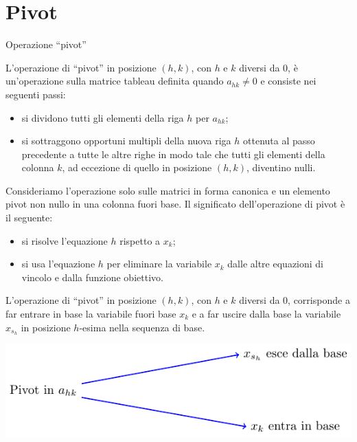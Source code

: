 \documentclass{beamer}
\begin{document}
\section{Pivot}

\begin{frame}[allowframebreaks]{Operazione ``pivot''}

L'operazione di ``pivot'' in posizione $(h, k )$,
con $h$ e $k$ diversi da 0,
\`e un'operazione sulla matrice tableau definita
quando $a_{hk} \neq 0$ e consiste nei seguenti passi:

\begin{itemize}
\item si dividono tutti gli elementi della riga $h$ per $a_{hk}$;

\item si sottraggono opportuni multipli della nuova riga $h$
	ottenuta al passo precedente a tutte le altre righe in modo
	tale che tutti gli elementi della colonna $k$, ad eccezione
	di quello in posizione $(h, k )$, diventino nulli.
\end{itemize}

\framebreak

Consideriamo l'operazione solo sulle matrici in forma canonica e un elemento pivot non nullo in una colonna fuori  base.
Il significato dell'operazione di pivot \`e il seguente:

\begin{itemize}
\item si risolve l'equazione $h$ rispetto a $x_k$;

\item si usa l'equazione $h$ per eliminare la variabile
	$x_k$ dalle altre equazioni di vincolo e dalla funzione
	obiettivo.
\end{itemize}

L'operazione di ``pivot'' in posizione $(h, k )$, con $h$ e $k$
diversi da 0, corrisponde a far entrare in base la variabile
fuori base $x_k$ e a far uscire dalla base la variabile $x_{s_h}$
in posizione $h$-esima nella sequenza di base.

\begin{center}
\includegraphics{img/pivot_entra_esce}
\end{center}


\end{frame}
\end{document}
